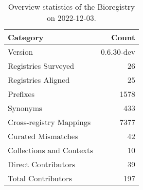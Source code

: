 \begin{table}
\centering
\caption{Overview statistics of the Bioregistry on 2022-12-03.}
\label{tab:bioregistry-summary}
\begin{tabular}{lr}
\toprule
                Category &      Count \\
\midrule
                 Version & 0.6.30-dev \\
     Registries Surveyed &         26 \\
      Registries Aligned &         25 \\
                Prefixes &       1578 \\
                Synonyms &        433 \\
 Cross-registry Mappings &       7377 \\
      Curated Mismatches &         42 \\
Collections and Contexts &         10 \\
     Direct Contributors &         39 \\
      Total Contributors &        197 \\
\bottomrule
\end{tabular}
\end{table}
